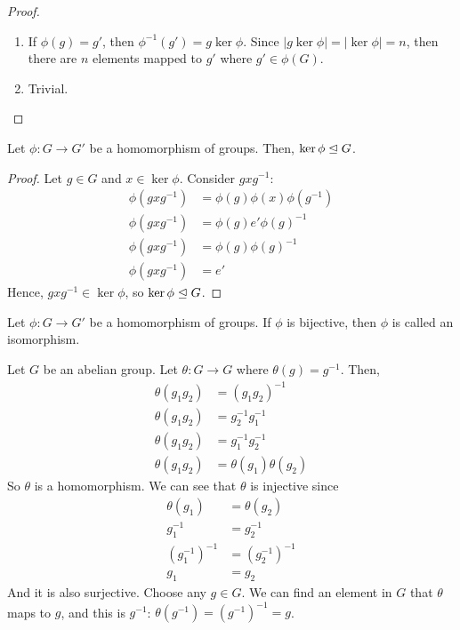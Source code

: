 \begin{proof}
\begin{enumerate}
            \item If \(\phi(g) = g'\), then \(\phi^{-1}(g') = g\ker\phi\). Since \(|g\ker\phi| = |\ker\phi| = n\), then there are \(n\) elements mapped to \(g'\) where \(g' \in \phi(G)\).

            \item Trivial.
        \end{enumerate}
    \end{proof}

    \begin{thm}
        Let \(\phi : G \to G'\) be a homomorphism of groups. Then, \(\ker\phi \trianglelefteq G\).
    \end{thm}

    \begin{proof}
        Let \(g\in G\) and \(x \in \ker\phi\). Consider \(gxg^{-1}\):
        \begin{align*}
            \phi(gxg^{-1}) &= \phi(g)\phi(x)\phi(g^{-1}) \\
            \phi(gxg^{-1}) &= \phi(g)e'\phi(g)^{-1} \\
            \phi(gxg^{-1}) &= \phi(g)\phi(g)^{-1} \\
            \phi(gxg^{-1}) &= e'
        \end{align*}
        Hence, \(gxg^{-1} \in \ker\phi\), so \(\ker\phi \trianglelefteq G\).
    \end{proof}

    \begin{dfn}[Isomorphism]
        Let \(\phi : G \to G'\) be a homomorphism of groups. If \(\phi\) is bijective, then \(\phi\) is called an isomorphism.
    \end{dfn}

    \begin{example}
        Let \(G\) be an abelian group. Let \(\theta : G \to G\) where \(\theta(g) = g^{-1}\). Then,
        \begin{align*}
            \theta(g_1g_2) &= (g_1g_2)^{-1} \\
            \theta(g_1g_2) &= g_2^{-1}g_1^{-1} \\
            \theta(g_1g_2) &= g_1^{-1}g_2^{-1} \\
            \theta(g_1g_2) &= \theta(g_1)\theta(g_2)
        \end{align*}
        So \(\theta\) is a homomorphism. We can see that \(\theta\) is injective since
        \begin{align*}
            \theta(g_1) &= \theta(g_2) \\
            g_1^{-1} &= g_2^{-1} \\
            (g_1^{-1})^{-1} &= (g_2^{-1})^{-1} \\
            g_1 &= g_2
        \end{align*}
        And it is also surjective. Choose any \(g\in G\). We can find an element in \(G\) that \(\theta\) maps to \(g\), and this is \(g^{-1}\): \(\theta(g^{-1}) = (g^{-1})^{-1} = g\).
    \end{example}